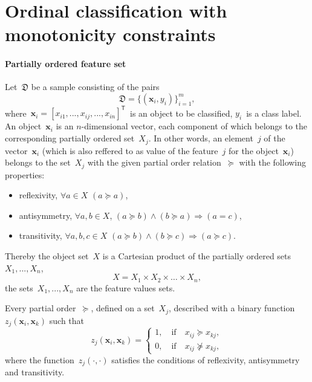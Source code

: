 \documentclass[12pt,preprint]{elsarticle}
\newcommand{\bx}{\mathbf{x}}
\newcommand{\T}{^{\mathsf{T}}}
\begin{document}
\section{Ordinal classification with monotonicity constraints}
\paragraph{Partially ordered feature set}
Let~$\mathfrak{D}$ be a sample consisting of the pairs
\[
\mathfrak{D}=\{(\bx_i,y_i)\}_{i=1}^m,
\label{eq:Sample}
\]
where~$\bx_i=[x_{i1},...,x_{ij},...,x_{in}]\T$~is an object to be classified, $y_i$~is a class label. An object~$\bx_i$ is an $n$-dimensional vector, each component of which belongs to the corresponding partially ordered set~$X_j$. In other words, an element~$j$ of the vector~$\bx_i$ (which is also reffered to as value of the feature~$j$ for the object~$\bx_i$) belongs to the set~$X_j$ with the given partial order relation~$\succeq$ with the following properties:
\begin{itemize}
\item reflexivity, $\forall a\in X$ $(a\succeq a)$,
\item antisymmetry, $\forall a,b\in X$, $(a\succeq b)\wedge(b\succeq a)\Rightarrow (a= c)$,
\item transitivity, $\forall a,b,c\in X$ $(a\succeq b)\wedge(b\succeq c)\Rightarrow (a\succeq c)$.
\end{itemize}
Thereby the object set~$X$ is a Cartesian product of the partially ordered sets~$X_1,...,X_n$,
\[
X=X_1\times X_2\times \dots \times X_n,
\]
the sets~$X_1,...,X_n$ are the feature values sets.

Every partial order~$\succeq$, defined on a set~$X_j$, described with a binary function~$z_j(\bx_i,\bx_k)$ such that
\[
z_j(\bx_i,\bx_k)=
\begin{cases}
1,\quad\text{if}\quad x_{ij} \succeq x_{kj}, \\
0,\quad\text{if}\quad x_{ij}\nsucceq x_{kj},
\end{cases}
\]
where the function~$z_j(\cdot,\cdot)$ satisfies the conditions of reflexivity, antisymmetry and transitivity.
\end{document}
